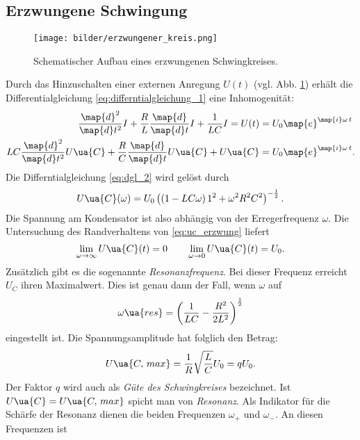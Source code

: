\subsection{Erzwungene Schwingung}
\begin{figure}
  \centering
  \texttt{[image: bilder/erzwungener\_kreis.png]}
  \caption{Schematischer Aufbau eines erzwungenen Schwingkreises\cite{anleitung354}. }
  \label{fig:erzwungen}
\end{figure}
Durch das Hinzuschalten einer externen Anregung $U(t)$ (vgl. Abb. \ref{fig:erzwungen}) %
erhält die Differentialgleichung \eqref{eq:differntialgleichung_1} eine %
Inhomogenität:
\begin{align}
  \frac{\map{d}^2}{\map{d}t^2}I+\frac{R}{L}\frac{\map{d}}{\map{d}t}I+\frac{1}{LC}I=U(t)&=U_0\map{e}^{\map{i}\omega\, t}\notag \\
  LC\frac{\map{d}^2}{\map{d}t^2}U\ua{C}+\frac{R}{C}\frac{\map{d}}{\map{d}t}U\ua{C}+U\ua{C}&=U_0\map{e}^{\map{i}\omega\, t}. \label{eq:dgl_2}
\end{align}
Die Differntialgleichung \eqref{eq:dgl_2} wird gelöst durch
\begin{equation}
  \label{eq:uc_erzwung}
  U\ua{C}(\omega)=U_0\left(\left(1-LC\omega\right)1^2+\omega^2R^2C^2\right)^{-\frac{1}{2}}.
\end{equation}
Die Spannung am Kondensator ist also abhängig von der Erregerfrequenz $\omega$.
Die Untersuchung des Randverhaltens von \eqref{eq:uc_erzwung} liefert
\begin{equation*}
  \lim_{\omega \to \infty} U\ua{C}(t)=0 \qquad \lim_{\omega \to 0} U\ua{C}(t)=U_0.
\end{equation*}
Zusätzlich gibt es die sogenannte \emph{Resonanzfrequenz}.
Bei dieser Frequenz erreicht $U_C$ ihren Maximalwert. Dies ist genau dann der Fall, wenn
$\omega$ auf
\begin{equation*}
  \label{eq:resonanzfrequenz}
  \omega\ua{res}=\left(\frac{1}{LC}-\frac{R^2}{2L^2}\right)^{\frac{1}{2}}
\end{equation*}
eingestellt ist.
Die Spannungsamplitude hat folglich den Betrag:
\begin{equation}
  \label{eq:spann_ampli}
  U\ua{C,\, max}=\frac{1}{R}\sqrt{\frac{L}{C}}U_0=qU_0.
\end{equation}
Der Faktor $q$ wird auch als \emph{Güte des Schwingkreises} bezeichnet.
Ist $U\ua{C}=U\ua{C,\, max}$ spicht man von \emph{Resonanz}.
Als Indikator für die Schärfe der Resonanz dienen die beiden
Frequenzen $\omega_+$ und $\omega_-$. An diesen Frequenzen ist

